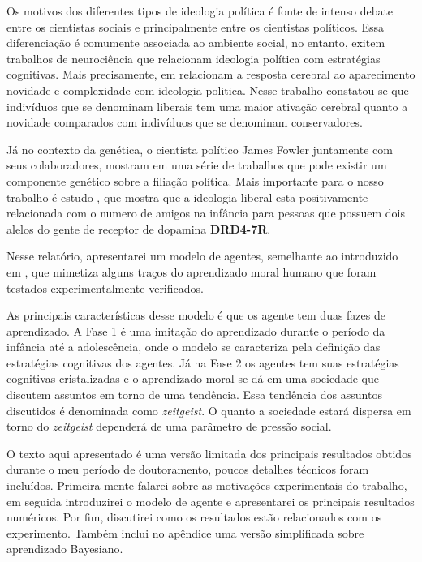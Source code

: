 Os motivos dos diferentes tipos de ideologia política é fonte de intenso debate
entre os cientistas sociais e principalmente entre os cientistas políticos.
Essa diferenciação é comumente associada ao ambiente social, no entanto, exitem
trabalhos de neurociência que relacionam ideologia política com estratégias
cognitivas. Mais precisamente, em \citep{Amodio2007} relacionam  a resposta
cerebral ao aparecimento novidade e complexidade com ideologia politica.  Nesse
trabalho constatou-se que indivíduos que se denominam liberais tem uma maior
ativação cerebral quanto a novidade comparados com  indivíduos que se denominam
conservadores. 

Já no contexto da genética, o cientista político James Fowler juntamente com
seus colaboradores, mostram em uma série de trabalhos que pode existir um
componente genético sobre a filiação política. Mais importante para o nosso
trabalho é estudo \citep{Fowler2008}, que mostra que a ideologia liberal esta
positivamente relacionada com o numero de amigos na infância para  pessoas que
possuem dois alelos do gente de receptor de dopamina \textbf{DRD4-7R}. 

Nesse relatório, apresentarei um modelo de agentes, semelhante ao introduzido em
\citep{Caticha2011a}, que mimetiza alguns traços do aprendizado moral humano
que foram testados experimentalmente verificados.

As principais características desse modelo é que os agente tem duas fazes de
aprendizado. A Fase 1 é uma imitação do aprendizado durante o período da
infância até a adolescência, onde o modelo se caracteriza pela definição das
estratégias cognitivas dos agentes. Já na Fase 2 os agentes tem suas
estratégias cognitivas cristalizadas e o aprendizado moral se dá em uma
sociedade que discutem assuntos em torno de uma tendência. Essa tendência dos
assuntos discutidos é denominada como \textit{zeitgeist}. O quanto a sociedade
estará dispersa em torno do \textit{zeitgeist} dependerá de uma parâmetro de
pressão social. 

O texto aqui apresentado é uma versão limitada dos
principais resultados obtidos durante o meu período de doutoramento, poucos
detalhes técnicos foram incluídos. Primeira mente falarei sobre as motivações
experimentais do trabalho, em seguida introduzirei o modelo de agente e
apresentarei os principais resultados numéricos. Por fim, discutirei como os
resultados estão relacionados com os experimento. Também inclui no apêndice uma
versão simplificada sobre aprendizado Bayesiano. 

